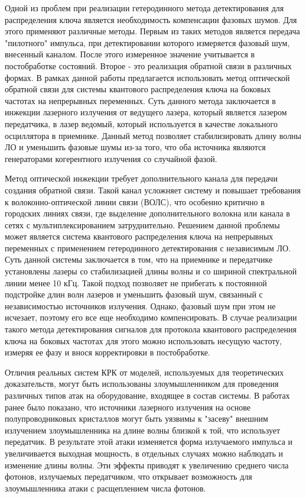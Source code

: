 Одной из проблем при реализации гетеродинного метода детектирования для распределения ключа является необходимость компенсации фазовых шумов. Для этого применяют различные методы. Первым из таких методов является передача "пилотного" импульса, при детектировании которого измеряется фазовый шум, внесенный каналом. После этого измеренное значение учитывается в постобработке состояний. Второе - это реализация обратной связи в различных формах. В рамках данной работы предлагается использовать метод оптической обратной связи для системы квантового распределения ключа на боковых частотах на непрерывных переменных. Суть данного метода заключается в инжекции лазерного излучения от ведущего лазера, который является лазером передатчика, в лазер ведомый, который используется в качестве локального осциллятора в приемнике. Данный метод позволяет стабилизировать длину волны ЛО и уменьшить фазовые шумы из-за того, что оба источника являются генераторами когерентного излучения со случайной фазой.

Метод оптической инжекции требует дополнительного канала для передачи создания обратной связи. Такой канал усложняет систему и повышает требования к волоконно-оптической линии связи (ВОЛС), что особенно критично в городских линиях связи, где выделение дополнительного волокна или канала в сетях с мультиплексированием затруднительно. Решением данной проблемы может является система квантового распределения ключа на непрерывных переменных с применением гетеродинного детектирования с независимым ЛО. Суть данной системы заключается в том, что на приемнике и передатчике установлены лазеры со стабилизацией длины волны и со шириной спектральной линии менее 10 кГц. Такой подход позволяет не прибегать к постоянной подстройке длин волн лазеров и уменьшить фазовый шум, связанный с независимостью источников излучения.
Однако, фазовый шум при этом не исчезает, поэтому его все еще необходимо компенсировать. В случае реализации такого метода детектирования сигналов для протокола квантового распределения ключа на боковых частотах для этого можно использовать несущую частоту, измеряя ее фазу и внося корректировки в постобработке. 

Отличия реальных систем КРК от моделей, используемых для теоретических доказательств, могут быть использованы злоумышленником для проведения различных типов атак на оборудование, входящее в состав системы. В работах ранее было показано, что источники лазерного излучения на основе полупроводниковых кристаллов могут быть уязвимы к "засеву" внешним излучением злоумышленника на длине волны близкой к той, что использует передатчик. В результате этой атаки изменяется форма излучаемого импульса и увеличивается выходная мощность, в отдельных случаях можно наблюдать и изменение длины волны. Эти эффекты приводят к увеличению среднего числа фотонов, излучаемых передатчиком, что открывает возможность для злоумышленника атаки с расщеплением числа фотонов. 

